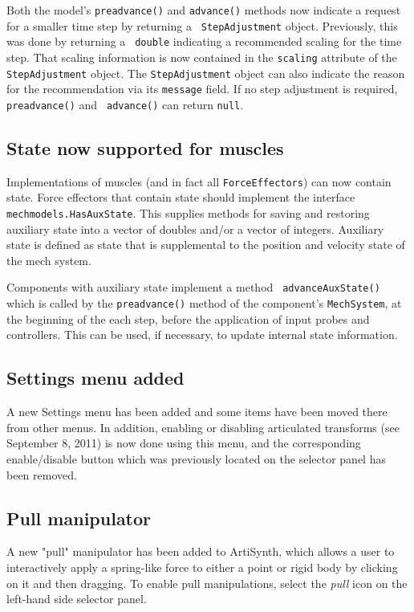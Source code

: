 \documentclass{article}
\begin{document}
Both the model's {\tt preadvance()} and {\tt advance()} methods now
indicate a request for a smaller time step by returning a {\tt
StepAdjustment} object. Previously, this was done by returning a {\tt
double} indicating a recommended scaling for the time step.  That
scaling information is now contained in the {\tt scaling} attribute of
the {\tt StepAdjustment} object. The {\tt StepAdjustment} object can
also indicate the reason for the recommendation via its {\tt message}
field. If no step adjustment is required, {\tt preadvance()} and {\tt
advance()} can return {\tt null}.

\subsection*{State now supported for muscles}

Implementations of muscles (and in fact all {\tt ForceEffectors}) can
now contain state. Force effectors that contain state should implement
the interface {\tt mechmodels.HasAuxState}. This supplies methods for
saving and restoring auxiliary state into a vector of doubles and/or a
vector of integers. Auxiliary state is defined as state that is
supplemental to the position and velocity state of the mech system.

Components with auxiliary state implement a method {\tt
advanceAuxState()} which is called by the {\tt preadvance()} method of
the component's {\tt MechSystem}, at the beginning of the each step,
before the application of input probes and controllers.  This can
be used, if necessary, to update internal state information.

\subsection*{Settings menu added}

A new {\sf Settings} menu has been added and some items have been
moved there from other menus. In addition, enabling or disabling
articulated transforms (see September 8, 2011) is now done using this
menu, and the corresponding enable/disable button which was previously
located on the selector panel has been removed.

\subsection*{Pull manipulator}

A new "pull" manipulator has been added to ArtiSynth, which allows a
user to interactively apply a spring-like force to either a point or 
rigid body by clicking on it and then dragging. To enable pull
manipulations, select the {\it pull} icon on the left-hand side
selector panel.
\end{document}
